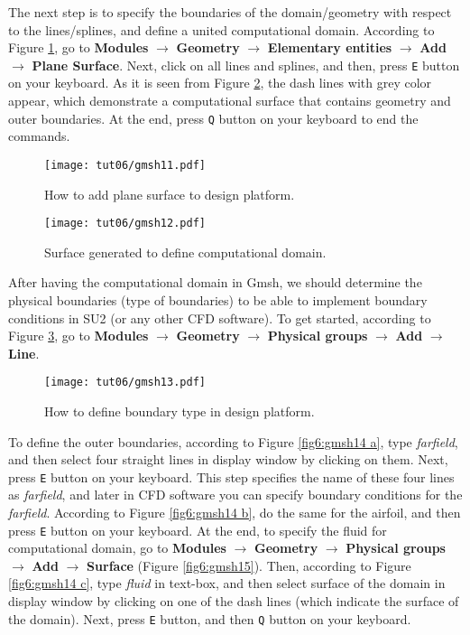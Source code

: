 The next step is to specify the boundaries of the domain/geometry with respect to the lines/splines, and define a united computational domain. According to Figure  \ref{fig6:gmsh11}, go to \textbf{Modules} $\rightarrow$ \textbf{Geometry} $\rightarrow$ \textbf{Elementary entities} $\rightarrow$ \textbf{Add} $\rightarrow$ \textbf{Plane Surface}. Next, click on all lines and splines, and then, press \texttt{E} button on your keyboard. As it is seen from Figure \ref{fig6:gmsh12}, the dash lines with grey color appear, which demonstrate a computational surface that contains geometry and outer boundaries. At the end, press \texttt{Q} button on your keyboard to end the commands.
\begin{figure}[htbp]
    \centering
    \texttt{[image: tut06/gmsh11.pdf]}
    \caption{How to add plane surface to design platform.}
    \label{fig6:gmsh11}
\end{figure}
\begin{figure}[htbp]
    \centering
    \texttt{[image: tut06/gmsh12.pdf]}
    \caption{Surface generated to define computational domain.}
    \label{fig6:gmsh12}
\end{figure}
After having the computational domain in Gmsh, we should determine the physical boundaries (type of boundaries) to be able to implement boundary conditions in SU2 (or any other CFD software). To get started, according to Figure \ref{fig6:gmsh13}, go to \textbf{Modules} $\rightarrow$ \textbf{Geometry} $\rightarrow$ \textbf{Physical groups} $\rightarrow$ \textbf{Add} $\rightarrow$ \textbf{Line}.
\begin{figure}[htbp]
    \centering
    \texttt{[image: tut06/gmsh13.pdf]}
    \caption{How to define boundary type in design platform.}
    \label{fig6:gmsh13}
\end{figure}
To define the outer boundaries, according to Figure \ref{fig6:gmsh14 a}, type \textit{farfield}, and then select four straight lines in display window by clicking on them. Next, press \texttt{E} button on your keyboard. This step specifies the name of these four lines as \textit{farfield}, and later in CFD software you can specify boundary conditions for the \textit{farfield}. According to Figure \ref{fig6:gmsh14 b}, do the same for the airfoil, and then press \texttt{E} button on your keyboard. At the end, to specify the fluid for computational domain, go to \textbf{Modules} $\rightarrow$ \textbf{Geometry} $\rightarrow$ \textbf{Physical groups} $\rightarrow$ \textbf{Add} $\rightarrow$ \textbf{Surface} (Figure \ref{fig6:gmsh15}). Then, according to Figure \ref{fig6:gmsh14 c}, type \textit{fluid} in text-box, and then select surface of the domain in display window by clicking on one of the dash lines (which indicate the surface of the domain). Next, press \texttt{E} button, and then \texttt{Q} button on your keyboard.

